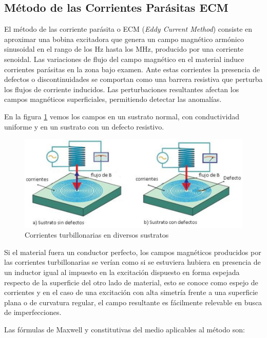 \subsection{Método de las Corrientes Parásitas ECM}

El método de las corriente parásita o ECM (\textit{Eddy Current Method}) consiste en aproximar una bobina excitadora que genera un campo magnético armónico sinusoidal en el rango de los Hz hasta los MHz, producido por una corriente senoidal. Las variaciones de flujo del campo magnético en el material induce corrientes parásitas en la zona bajo examen. Ante estas corrientes la presencia de defectos o discontinuidades se comportan como una barrera resistiva que perturba los flujos de corriente inducidos. Las perturbaciones resultantes afectan los campos magnéticos superficiales, permitiendo detectar las anomalías.

En la figura \ref{fig:57} vemos los campos en un sustrato normal, con conductividad uniforme y en un sustrato con un defecto resistivo.

\begin{figure}[H]
    \centering
    \includegraphics[width=1.0\textwidth]{./Figures/fig57}
	\caption{Corrientes turbillonarias en diversos sustratos}
	\label{fig:57}
\end{figure}

Si el material fuera un conductor perfecto, los campos magnéticos producidos por las corrientes turbillonarias se verían como si se estuviera hubiera en presencia de un inductor igual al impuesto en la excitación dispuesto en forma espejada respecto de la superficie del otro lado de material, esto se conoce como espejo de corrientes y en el caso de una excitación con alta simetría frente a una superficie plana o de curvatura regular, el campo resultante es fácilmente relevable en busca de imperfecciones.

Las fórmulas de Maxwell y constitutivas del medio aplicables al método son:

